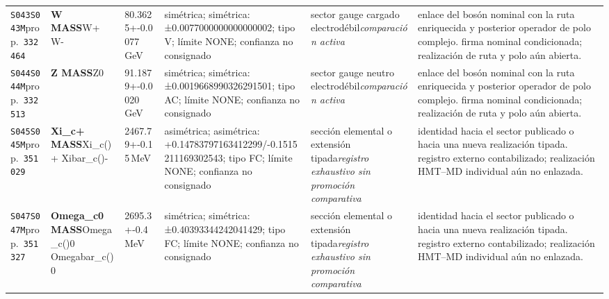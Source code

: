\begin{landscape}
\begin{longtable}{L{1.85cm}L{4.45cm}L{2.35cm}L{4.05cm}L{3.35cm}L{7.15cm}}
\texttt{S043}\newline \texttt{S043M}\newline prop.\ \texttt{332464} & \textbf{W MASS}\newline W+ \textbar{}\allowbreak{} W- & 80.3625+-0.0077\,GeV & simétrica; simétrica: ±0.0077000000000000002; tipo V; límite NONE; confianza no consignado & sector gauge cargado electrodébil\newline \emph{comparación activa} & enlace del bosón nominal con la ruta enriquecida y posterior operador de polo complejo. firma nominal condicionada; realización de ruta y polo aún abierta. \\
\texttt{S044}\newline \texttt{S044M}\newline prop.\ \texttt{332513} & \textbf{Z MASS}\newline Z0 & 91.1879+-0.0020\,GeV & simétrica; simétrica: ±0.0019668990326291501; tipo AC; límite NONE; confianza no consignado & sector gauge neutro electrodébil\newline \emph{comparación activa} & enlace del bosón nominal con la ruta enriquecida y posterior operador de polo complejo. firma nominal condicionada; realización de ruta y polo aún abierta. \\
\texttt{S045}\newline \texttt{S045M}\newline prop.\ \texttt{351029} & \textbf{Xi\_\allowbreak{}c+ MASS}\newline Xi\_\allowbreak{}c()+ \textbar{}\allowbreak{} Xibar\_\allowbreak{}c()- & 2467.79+-0.15\,MeV & asimétrica; asimétrica: +0.14783797163412299/-0.1515211169302543; tipo FC; límite NONE; confianza no consignado & sección elemental o extensión tipada\newline \emph{registro exhaustivo sin promoción comparativa} & identidad hacia el sector publicado o hacia una nueva realización tipada. registro externo contabilizado; realización HMT--MD individual aún no enlazada. \\
\texttt{S047}\newline \texttt{S047M}\newline prop.\ \texttt{351327} & \textbf{Omega\_\allowbreak{}c0 MASS}\newline Omega\_\allowbreak{}c()0 \textbar{}\allowbreak{} Omegabar\_\allowbreak{}c()0 & 2695.3+-0.4\,MeV & simétrica; simétrica: ±0.40393344242041429; tipo FC; límite NONE; confianza no consignado & sección elemental o extensión tipada\newline \emph{registro exhaustivo sin promoción comparativa} & identidad hacia el sector publicado o hacia una nueva realización tipada. registro externo contabilizado; realización HMT--MD individual aún no enlazada. \\

\end{longtable}
\end{landscape}
